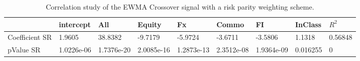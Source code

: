\begin{table}[H]
\centering
\begin{tabular}{lllllllll}
\hline& intercept & All & Equity & Fx & Commo & FI & InClass & $R^{2}$ \\ 
\hline 
Coefficient SR & 1.9605 & 38.8382 & -9.7179 & -5.9724 & -3.6711 & -3.5806 & 1.1318 & 0.56848 \\ 
pValue SR & 1.0226e-06 & 1.7376e-20 & 2.0085e-16 & 1.2873e-13 & 2.3512e-08 & 1.9364e-09 & 0.016255 & 0 \\ 
\hline
\end{tabular}
\caption{Correlation study of the EWMA Crossover signal with a risk parity weighting scheme.}
\label{MBBSRPNR_CORR}
\end{table}
